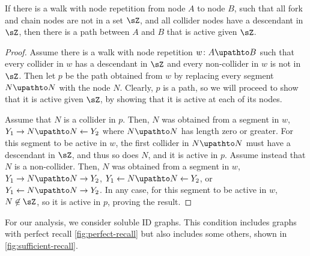 \begin{lemma}  \label{21jan21.2-excising-loops-from-active-walks-to-get-active-paths}
If there is a walk with node repetition
from node $A$ to node $B$, such that all fork and chain nodes are not in a set $\sZ$, and all collider nodes have a descendant in $\sZ$, then there is a path between $A$ and $B$ that is active given $\sZ$.
\end{lemma}
\newcommand{\walk}{w}
\newcommand{\ppath}{p}
\begin{proof}
Assume there is a walk with node repetition $\walk\colon A \upathto B$ such that every collider in $\walk$ has a descendant in $\sZ$ and every non-collider in $w$ is not in $\sZ$. 
Then let $p$ be the path obtained from $\walk$ 
by replacing every segment $N \upathto N$ with the node $N$.
Clearly, $\ppath$ is a path, so we will proceed to show that it is active given $\sZ$,
by showing that it is active at each of its nodes.

Assume that $N$ is a collider in $p$.
Then, $N$ was obtained from 
a segment in $w$, $Y_1 \to N \upathto N \leftarrow Y_2$
where $N \upathto N$ has length zero or greater.
For this segment to be active in $w$,
the first collider in $N \upathto N$ must have a descendant in $\sZ$, 
and thus so does $N$, and it is active in $\ppath$.
Assume instead that $N$ is a non-collider.
Then, $N$ was obtained from 
a segment in $w$, $Y_1 \to N \upathto N \to Y_2$, 
$Y_1 \leftarrow N \upathto N \leftarrow Y_2$, or 
$Y_1 \leftarrow N \upathto N \to Y_2$.
In any case, for this segment to be active in $w$, 
$N \not \in \sZ$, so it is active in $\ppath$, proving the result.
\end{proof}


For our analysis, we consider soluble ID graphs.
This condition includes graphs with perfect recall \cref{fig:perfect-recall}
but also includes some others, shown in \cref{fig:sufficient-recall}.


